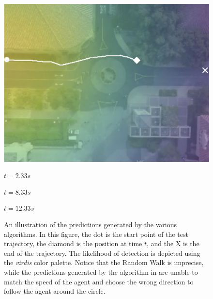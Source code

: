 \documentclass[letterpaper,10pt,conference]{ieeeconf}
\begin{document}
\begin{figure}
\begin{minipage}[c]{0.3\linewidth}
		\includegraphics[width=\linewidth]{./figures/comparison/rand_death_1_2_t=370.jpg}
	\end{minipage}
	
	\vspace{0.2cm}
	\hspace{.5cm}
	\begin{minipage}{0.3\linewidth}
		\centering
		$t = 2.33s$
	\end{minipage}
	\begin{minipage}{0.3\linewidth}
		\centering
		$t = 8.33s$
	\end{minipage}
	\begin{minipage}{0.3\linewidth}
		\centering
		$t = 12.33s$
	\end{minipage}
	
	\caption{An illustration of the predictions generated by the various algorithms. In this figure, the dot is the start point of the test trajectory, the diamond is the position at time $t$, and the X is the end of the trajectory. The likelihood of detection is depicted using the \textit{virdis} color palette. Notice that the Random Walk is imprecise, while the predictions generated by the algorithm in \cite{Kitani2012} are unable to match the speed of the agent and choose the wrong direction to follow the agent around the circle.}
	
	\label{fig:death-1-2}
\end{figure}

  
\end{document}
